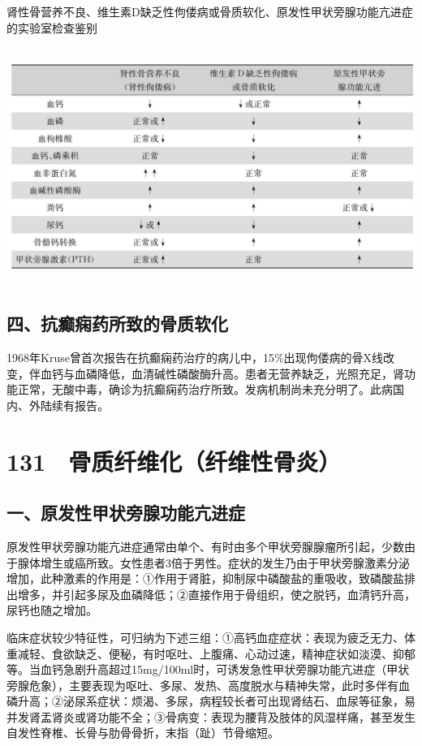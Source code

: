 \begin{table}[htbp]
\centering
\caption{肾性骨营养不良、维生素D缺乏性佝偻病或骨质软化、原发性甲状旁腺功能亢进症的实验室检查鉴别}
\label{tab39-3}
\includegraphics[width=5.92708in,height=3.04167in]{./images/Image00246.jpg}
\end{table}

\subsection{四、抗癫痫药所致的骨质软化}

1968年Kruse曾首次报告在抗癫痫药治疗的病儿中，15\%出现佝偻病的骨X线改变，伴血钙与血磷降低，血清碱性磷酸酶升高。患者无营养缺乏，光照充足，肾功能正常，无酸中毒，确诊为抗癫痫药治疗所致。发病机制尚未充分明了。此病国内、外陆续有报告。

\protect\hypertarget{text00309.html}{}{}

\section{131　骨质纤维化（纤维性骨炎）}

\subsection{一、原发性甲状旁腺功能亢进症}

原发性甲状旁腺功能亢进症通常由单个、有时由多个甲状旁腺腺瘤所引起，少数由于腺体增生或癌所致。女性患者3倍于男性。症状的发生乃由于甲状旁腺激素分泌增加，此种激素的作用是：①作用于肾脏，抑制尿中磷酸盐的重吸收，致磷酸盐排出增多，并引起多尿及血磷降低；②直接作用于骨组织，使之脱钙，血清钙升高，尿钙也随之增加。

临床症状较少特征性，可归纳为下述三组：①高钙血症症状：表现为疲乏无力、体重减轻、食欲缺乏、便秘，有时呕吐、上腹痛、心动过速，精神症状如淡漠、抑郁等。当血钙急剧升高超过15mg/100ml时，可诱发急性甲状旁腺功能亢进症（甲状旁腺危象），主要表现为呕吐、多尿、发热、高度脱水与精神失常，此时多伴有血磷升高；②泌尿系症状：烦渴、多尿，病程较长者可出现肾结石、血尿等征象，易并发肾盂肾炎或肾功能不全；③骨病变：表现为腰背及肢体的风湿样痛，甚至发生自发性脊椎、长骨与肋骨骨折，末指（趾）节骨缩短。

